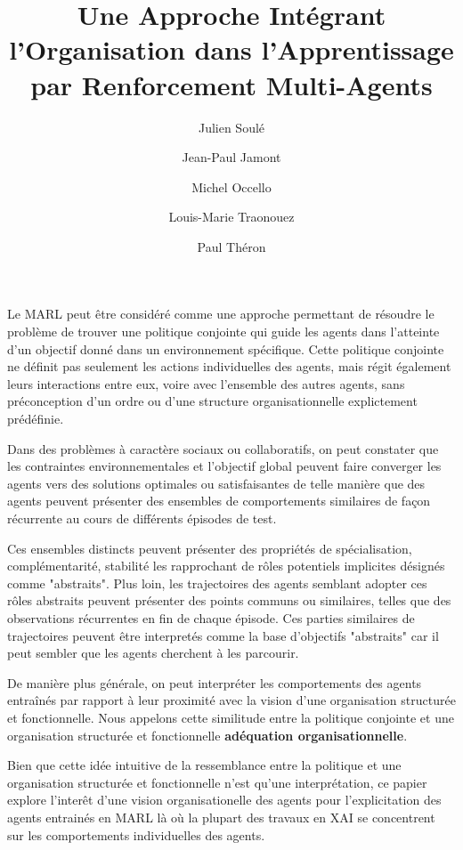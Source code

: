 \documentclass[sigconf,anonymous]{aamas}
\title[AAMAS-2025 CybMASDE]{Une Approche Intégrant l'Organisation dans l'Apprentissage par Renforcement Multi-Agents}
\author{Julien Soulé}
\affiliation{
  \institution{Univ. Grenoble Alpes}
  \city{Valence}
  \country{France}}
\author{Jean-Paul Jamont}
\affiliation{
  \institution{Univ. Grenoble Alpes}
  \city{Valence}
  \country{France}}
\author{Michel Occello}
\affiliation{
  \institution{Univ. Grenoble Alpes}
  \city{Valence}
  \country{France}}
\author{Louis-Marie Traonouez}
\affiliation{
  \institution{Thales Land and Air Systems, BU IAS}
  \city{Rennes}
  \country{France}}
\author{Paul Théron}
\affiliation{
  \institution{AICA IWG}
  \city{La Guillermie}
  \country{France}}
\begin{document}

\pagestyle{fancy}
\fancyhead{}


\maketitle


Le MARL peut être considéré comme une approche permettant de résoudre le problème de trouver une politique conjointe qui guide les agents dans l'atteinte d'un objectif donné dans un environnement spécifique.
Cette politique conjointe ne définit pas seulement les actions individuelles des agents, mais régit également leurs interactions entre eux, voire avec l'ensemble des autres agents, sans préconception d'un ordre ou d'une structure organisationnelle explictement prédéfinie.

Dans des problèmes à caractère sociaux ou collaboratifs, on peut constater que les contraintes environnementales et l'objectif global peuvent faire converger les agents vers des solutions optimales ou satisfaisantes de telle manière que des agents peuvent présenter des ensembles de comportements similaires de façon récurrente au cours de différents épisodes de test.

Ces ensembles distincts peuvent présenter des propriétés de spécialisation, complémentarité, stabilité les rapprochant de rôles potentiels implicites désignés comme "abstraits". Plus loin, les trajectoires des agents semblant adopter ces rôles abstraits peuvent présenter des points communs ou similaires, telles que des observations récurrentes en fin de chaque épisode. Ces parties similaires de trajectoires peuvent être interpretés comme la base d'objectifs "abstraits" car il peut sembler que les agents cherchent à les parcourir.

De manière plus générale, on peut interpréter les comportements des agents entraînés par rapport à leur proximité avec la vision d'une organisation structurée et fonctionnelle. Nous appelons cette similitude entre la politique conjointe et une organisation structurée et fonctionnelle \textbf{adéquation organisationnelle}.

Bien que cette idée intuitive de la ressemblance entre la politique et une organisation structurée et fonctionnelle n'est qu'une interprétation, ce papier explore l'interêt d'une vision organisationelle des agents pour l'explicitation des agents entrainés en MARL là où la plupart des travaux en XAI se concentrent sur les comportements individuelles des agents.
\end{document}
